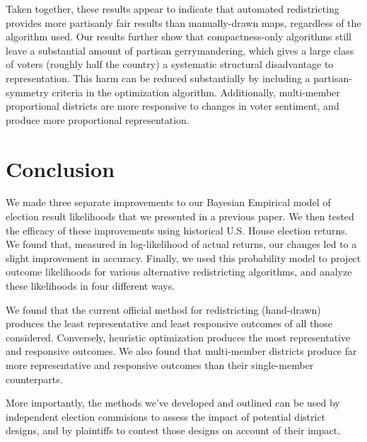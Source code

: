 \documentclass[preprint,12pt]{article}
\begin{document}
Taken together, these results appear to indicate that automated redistricting provides more partisanly fair results than manually-drawn maps, regardless of the algorithm used.  Our results further show that compactness-only algorithms still leave a substantial amount of partisan gerrymandering, which gives a large class of voters (roughly half the country) a systematic structural disadvantage to representation.  This harm can be reduced substantially by including a partisan-symmetry criteria in the optimization algorithm.  Additionally, multi-member proportional districts are more responsive to changes in voter sentiment, and produce more proportional representation.

\section{Conclusion}

We made three separate improvements to our Bayesian Empirical model of election result likelihoods that we presented in a previous paper.  We then tested the efficacy of these improvements using historical U.S. House election returns.  We found that, measured in log-likelihood of actual returns, our changes led to a slight improvement in accuracy.  Finally, we used this probability model to project outcome likelihoods for various alternative redistricting algorithms, and analyze these likelihoods in four different ways.

We found that the current official method for redistricting (hand-drawn) produces the least representative and least responsive outcomes of all those considered.  Conversely, heuristic optimization produces the most representative and responsive outcomes.  We also found that multi-member districts produce far more representative and responsive outcomes than their single-member counterparts.

More importantly, the methods we've developed and outlined can be used by independent election commisions to assess the impact of potential district designs, and by plaintiffs to contest those designs on account of their impact.



\clearpage
\end{document}
